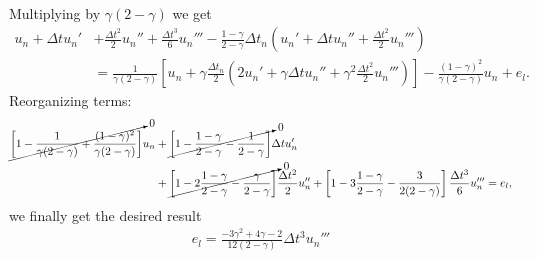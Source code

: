 \begin{questions}
\begin{solution}
\begin{itemize}
\begin{align*}
\end{align*}
Multiplying by $\gamma(2-\gamma)$ we get
\begin{align*}
u_n+\Delta tu_n'&+\frac{\Delta t^2}{2} u_n''+\frac{\Delta t^3}{6} u_n'''-\frac{1-\gamma}{2-\gamma}\Delta t_n\left(u_n'+\Delta tu_n''+\frac{\Delta t^2}{2} u_n'''\right)\\
&=\frac{1}{\gamma(2-\gamma)}\left[u_n+\gamma\frac{\Delta t_n}{2}\left(2u_n'+\gamma\Delta tu_n''+\gamma^2\frac{\Delta t^2}{2} u_n'''\right)\right]-\frac{(1-\gamma)^2}{\gamma(2-\gamma)}u_n+e_l.
\end{align*}
Reorganizing terms:
\begin{align*}
\cancelto{0}{\left[1-\frac{1}{\gamma(2-\gamma)}+\frac{(1-\gamma)^2}{\gamma(2-\gamma)}\right]}u_n&+\cancelto{0}{\left[1-\frac{1-\gamma}{2-\gamma}-\frac{1}{2-\gamma}\right]}\Delta tu_n'\\
&+\cancelto{0}{\left[1-2\frac{1-\gamma}{2-\gamma}-\frac{\gamma}{2-\gamma}\right]}\frac{\Delta t^2}{2} u_n''+\left[1-3\frac{1-\gamma}{2-\gamma}-\frac{3}{2(2-\gamma)}\right]\frac{\Delta t^3}{6} u_n'''=e_l,
\end{align*}
we finally get the desired result
\begin{align*}
e_l=\frac{-3\gamma^2+4\gamma-2}{12(2-\gamma)}\Delta t^3 u_n'''
\end{align*}
\end{itemize}
\end{solution}
\end{questions}
